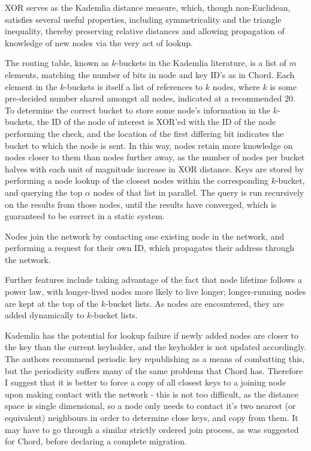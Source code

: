 XOR serves as the Kademlia distance measure, which, though non-Euclidean, satisfies several useful properties, including symmetricality and the triangle inequality, thereby preserving relative distances and allowing propagation of knowledge of new nodes via the very act of lookup.

The routing table, known as $k$-buckets in the Kademlia literature, is a list of $m$ elements, matching the number of bits in node and key ID's as in Chord.
Each element in the $k$-buckets is itself a list of references to $k$ nodes, where $k$ is some pre-decided number shared amongst all nodes, indicated at a recommended 20.
To determine the correct bucket to store some node's information in the $k$-buckets, the ID of the node of interest is XOR'ed with the ID of the node performing the check, and the location of the first differing bit indicates the bucket to which the node is sent.
In this way, nodes retain more knowledge on nodes closer to them than nodes further away, as the number of nodes per bucket halves with each unit of magnitude increase in XOR distance.
Keys are stored by performing a node lookup of the closest nodes within the corresponding $k$-bucket, and querying the top $\alpha$ nodes of that list in parallel.
The query is run recursively on the results from those nodes, until the results have converged, which is guaranteed to be correct in a static system.

Nodes join the network by contacting one existing node in the network, and performing a request for their own ID, which propagates their address through the network.

Further features include taking advantage of the fact that node lifetime follows a power law, with longer-lived nodes more lkely to live longer; longer-running nodes are kept at the top of the $k$-bucket lists.
As nodes are encountered, they are added dynamically to $k$-bucket lists.

Kademlia has the potential for lookup failure if newly added nodes are closer to the key than the current keyholder, and the keyholder is not updated accordingly.
The authors recommend periodic key republishing as a means of combatting this, but the periodicity suffers many of the same problems that Chord has.
Therefore I suggest that it is better to force a copy of all closest keys to a joining node upon making contact with the network - this is not too difficult, as the distance space is single dimensional, so a node only needs to contact it's two nearest (or equivalent) neighbours in order to determine close keys, and copy from them.
It may have to go through a similar strictly ordered join process, as was suggested for Chord, before declaring a complete migration.

